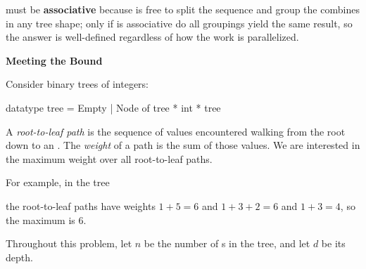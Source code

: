 \documentclass[addpoints,12pt]{exam}
\begin{document}
\begin{questions}
\begin{parts}
\begin{solutionorbox}[12em]
       must be \textbf{associative} because  is free
      to split the sequence and group the combines in any tree shape; only if
       is associative do all groupings yield the same result, so
      the answer is well-defined regardless of how the work is parallelized.
    \end{solutionorbox}
\end{parts}

\newpage
{}

\textbf{Meeting the Bound}

Consider binary trees of integers:

\begin{codeblock}
  datatype tree = Empty | Node of tree * int * tree
\end{codeblock}

A \textit{root-to-leaf path} is the sequence of values encountered walking from
the root down to an . The \textit{weight} of a path is the sum of
those values. We are interested in the maximum weight over all root-to-leaf
paths.

For example, in the tree

\begin{center}
\end{center}

the root-to-leaf paths have weights $1 + 5 = 6$ and $1 + 3 + 2 = 6$ and
$1 + 3 = 4$, so the maximum is $6$.

Throughout this problem, let $n$ be the number of s in the tree, and
let $d$ be its depth.

\end{questions}
\end{document}
